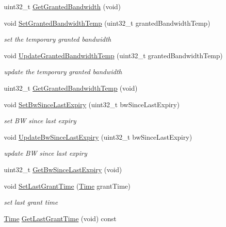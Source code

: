 \begin{DoxyCompactItemize}
uint32\+\_\+t \hyperlink{classns3_1_1ServiceFlowRecord_ac33f1f50b2a149e4c2b96bf380d4b8de}{Get\+Granted\+Bandwidth} (void)
\item 
void \hyperlink{classns3_1_1ServiceFlowRecord_a89eed628aea3472e6b0747dc4c8f8ed4}{Set\+Granted\+Bandwidth\+Temp} (uint32\+\_\+t granted\+Bandwidth\+Temp)
\begin{DoxyCompactList}\small\item\em set the temporary granted bandwidth \end{DoxyCompactList}\item 
void \hyperlink{classns3_1_1ServiceFlowRecord_a34682736045ee3d792489a0c4f0e6601}{Update\+Granted\+Bandwidth\+Temp} (uint32\+\_\+t granted\+Bandwidth\+Temp)
\begin{DoxyCompactList}\small\item\em update the temporary granted bandwidth \end{DoxyCompactList}\item 
uint32\+\_\+t \hyperlink{classns3_1_1ServiceFlowRecord_a32c55f7709953cd0a3a68b6d16fefe41}{Get\+Granted\+Bandwidth\+Temp} (void)
\item 
void \hyperlink{classns3_1_1ServiceFlowRecord_ab6918afc75ac4444a75f7f8d02790e70}{Set\+Bw\+Since\+Last\+Expiry} (uint32\+\_\+t bw\+Since\+Last\+Expiry)
\begin{DoxyCompactList}\small\item\em set BW since last expiry \end{DoxyCompactList}\item 
void \hyperlink{classns3_1_1ServiceFlowRecord_ac397793db8247eeec3b34194cca4e67a}{Update\+Bw\+Since\+Last\+Expiry} (uint32\+\_\+t bw\+Since\+Last\+Expiry)
\begin{DoxyCompactList}\small\item\em update BW since last expiry \end{DoxyCompactList}\item 
uint32\+\_\+t \hyperlink{classns3_1_1ServiceFlowRecord_a79e8077691c2c5a653db0b65a040cf15}{Get\+Bw\+Since\+Last\+Expiry} (void)
\item 
void \hyperlink{classns3_1_1ServiceFlowRecord_ad08898dbb6993808b09b55fe7057b3ac}{Set\+Last\+Grant\+Time} (\hyperlink{classns3_1_1Time}{Time} grant\+Time)
\begin{DoxyCompactList}\small\item\em set last grant time \end{DoxyCompactList}\item 
\hyperlink{classns3_1_1Time}{Time} \hyperlink{classns3_1_1ServiceFlowRecord_a10ba71840fb8eb79ce1df58ea7350e32}{Get\+Last\+Grant\+Time} (void) const 

\end{DoxyCompactItemize}
